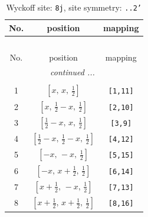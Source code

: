 \documentclass[fleqn,8pt]{jsarticle}
\begin{document}
\begin{longtable}{ccc}
\caption{Wyckoff site: {\tt 8j}, site symmetry: {\tt ..2'}}
 \\
 \hline \hline
No. & position & mapping \\ \hline \endfirsthead

\multicolumn{2}{l}{\tablename\ \thetable{}} \\
 \hline \hline
No. & position & mapping \\ \hline \endhead

 \hline \hline
\multicolumn{2}{r}{\footnotesize\it continued ...} \\ \endfoot

 \hline \hline
\multicolumn{2}{r}{} \\ \endlastfoot

1 & $\left[ x,\, x,\, \frac{1}{2} \right]$ & {\tt [1,11]} \\ \hline
2 & $\left[ x,\, \frac{1}{2} - x,\, \frac{1}{2} \right]$ & {\tt [2,10]} \\ \hline
3 & $\left[ \frac{1}{2} - x,\, x,\, \frac{1}{2} \right]$ & {\tt [3,9]} \\ \hline
4 & $\left[ \frac{1}{2} - x,\, \frac{1}{2} - x,\, \frac{1}{2} \right]$ & {\tt [4,12]} \\ \hline
5 & $\left[ - x,\, - x,\, \frac{1}{2} \right]$ & {\tt [5,15]} \\ \hline
6 & $\left[ - x,\, x + \frac{1}{2},\, \frac{1}{2} \right]$ & {\tt [6,14]} \\ \hline
7 & $\left[ x + \frac{1}{2},\, - x,\, \frac{1}{2} \right]$ & {\tt [7,13]} \\ \hline
8 & $\left[ x + \frac{1}{2},\, x + \frac{1}{2},\, \frac{1}{2} \right]$ & {\tt [8,16]} \\
\end{longtable}
\renewcommand{\arraystretch}{1.2}
\end{document}
